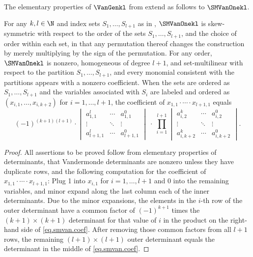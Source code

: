 \documentclass{toc}
\begin{document}
The elementary properties of $\VanGenkl$ from  extend as follows to $\SMVanOnekl$.
\begin{proposition}
  \label{prop.smvan1-basic}
  For any \(k,l\in \N\) and index sets \(S_1,\ldots,S_{l+1}\) as in , 
  \(\SMVanOnekl\) is skew-symmetric with respect to the order of the sets
  \(S_1,\ldots,S_{l+1}\), and the choice of order within each set, in that any permutation thereof changes the construction by merely multiplying by the sign of the permutation. For any order,
  \(\SMVanOnekl\) is nonzero, homogeneous of degree
  \(l+1\), and set-multilinear with respect to the partition \(S_1, \dots, S_{l+1}\), and
  every monomial consistent with the partitions appears with a nonzero coefficient.
  When the sets are ordered as \(S_1,\ldots,S_{l+1}\)
  and the variables associated with $S_i$ are labeled and ordered as
  \((x_{i,1},\ldots,x_{i,k+2})\) for \(i=1,\ldots,l+1\),
  the coefficient of \(x_{1,1}\cdot\cdots\cdot x_{l+1,1}\)
  equals
  \begin{equation}\label{eq.smvan.coef} 
  (-1)^{(k+1)(l+1)} \cdot 
    \begin{vmatrix*}
      a_{1,1}^l & \cdots & a_{1,1}^0 \\
      \vdots & \ddots & \vdots \\
      a_{l+1,1}^l & \cdots & a_{l+1,1}^0
    \end{vmatrix*}
    \;\cdot\;
    \prod_{i=1}^{l+1}
      \begin{vmatrix*}
        a_{i,2}^k & \cdots & a_{i,2}^0 \\
        \vdots & \ddots & \vdots \\
        a_{i,k+2}^k & \cdots & a_{i,k+2}^0
      \end{vmatrix*}.
  \end{equation}
\end{proposition}
\begin{proof}
  All assertions to be proved follow from elementary properties of
  determinants, that Vandermonde determinants are nonzero unless they
  have duplicate rows, and the following computation for the coefficient of \(x_{1,1}\cdot\cdots\cdot x_{l+1,1}\):
  Plug 1 into \(x_{i,1}\) for \(i=1,\ldots,l+1\) and 0 into the
  remaining variables, and minor expand along the last column each of the inner determinants. Due to the minor expansions, the elements in the $i$-th row of the outer determinant have a common factor of $(-1)^{k+1}$ times the $(k+1) \times (k+1)$ determinant for that value of $i$ in the product on the right-hand side of \eqref{eq.smvan.coef}. After removing those common factors from all $l+1$ rows, the remaining $(l+1) \times (l+1)$ outer determinant equals the determinant in the middle of \eqref{eq.smvan.coef}.
\end{proof}
\end{document}
